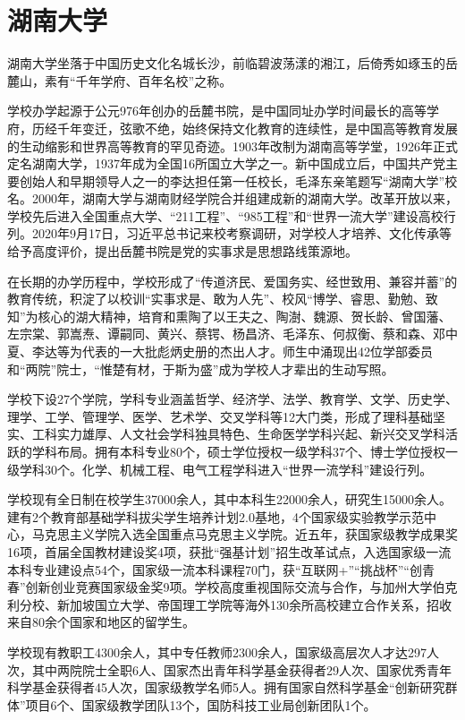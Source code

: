 \section{湖南大学}
湖南大学坐落于中国历史文化名城长沙，前临碧波荡漾的湘江，后倚秀如琢玉的岳麓山，素有“千年学府、百年名校”之称。

学校办学起源于公元976年创办的岳麓书院，是中国同址办学时间最长的高等学府，历经千年变迁，弦歌不绝，始终保持文化教育的连续性，是中国高等教育发展的生动缩影和世界高等教育的罕见奇迹。1903年改制为湖南高等学堂，1926年正式定名湖南大学，1937年成为全国16所国立大学之一。新中国成立后，中国共产党主要创始人和早期领导人之一的李达担任第一任校长，毛泽东亲笔题写“湖南大学”校名。2000年，湖南大学与湖南财经学院合并组建成新的湖南大学。改革开放以来，学校先后进入全国重点大学、“211工程”、“985工程”和“世界一流大学”建设高校行列。2020年9月17日，习近平总书记来校考察调研，对学校人才培养、文化传承等给予高度评价，提出岳麓书院是党的实事求是思想路线策源地。

在长期的办学历程中，学校形成了“传道济民、爱国务实、经世致用、兼容并蓄”的教育传统，积淀了以校训“实事求是、敢为人先”、校风“博学、睿思、勤勉、致知”为核心的湖大精神，培育和熏陶了以王夫之、陶澍、魏源、贺长龄、曾国藩、左宗棠、郭嵩焘、谭嗣同、黄兴、蔡锷、杨昌济、毛泽东、何叔衡、蔡和森、邓中夏、李达等为代表的一大批彪炳史册的杰出人才。师生中涌现出42位学部委员和“两院”院士，“惟楚有材，于斯为盛”成为学校人才辈出的生动写照。

学校下设27个学院，学科专业涵盖哲学、经济学、法学、教育学、文学、历史学、理学、工学、管理学、医学、艺术学、交叉学科等12大门类，形成了理科基础坚实、工科实力雄厚、人文社会学科独具特色、生命医学学科兴起、新兴交叉学科活跃的学科布局。拥有本科专业80个，硕士学位授权一级学科37个、博士学位授权一级学科30个。化学、机械工程、电气工程学科进入“世界一流学科”建设行列。

学校现有全日制在校学生37000余人，其中本科生22000余人，研究生15000余人。建有2个教育部基础学科拔尖学生培养计划2.0基地，4个国家级实验教学示范中心，马克思主义学院入选全国重点马克思主义学院。近五年，获国家级教学成果奖16项，首届全国教材建设奖4项，获批“强基计划”招生改革试点，入选国家级一流本科专业建设点54个，国家级一流本科课程70门，获“互联网+”“挑战杯”“创青春”创新创业竞赛国家级金奖9项。学校高度重视国际交流与合作，与加州大学伯克利分校、新加坡国立大学、帝国理工学院等海外130余所高校建立合作关系，招收来自80余个国家和地区的留学生。

学校现有教职工4300余人，其中专任教师2300余人，国家级高层次人才达297人次，其中两院院士全职6人、国家杰出青年科学基金获得者29人次、国家优秀青年科学基金获得者45人次，国家级教学名师5人。拥有国家自然科学基金“创新研究群体”项目6个、国家级教学团队13个，国防科技工业局创新团队1个。

